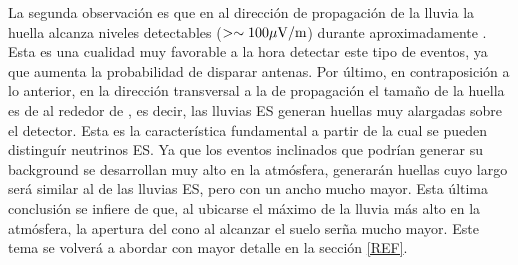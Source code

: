 	La segunda observación es que en al dirección de propagación de la lluvia la huella alcanza niveles detectables ($>\sim100{\rm \mu V/m}$) durante aproximadamente .
	Esta es una cualidad muy favorable a la hora detectar este tipo de eventos, ya que aumenta la probabilidad de disparar antenas.
	Por último, en contraposición a lo anterior, en la dirección transversal a la de propagación el tamaño de la huella es de al rededor de , es decir, las lluvias ES generan huellas muy alargadas sobre el detector.
	Esta es la característica fundamental a partir de la cual se pueden distinguír neutrinos ES. 
	Ya que los eventos inclinados que podrían generar su background se desarrollan muy alto en la atmósfera, generarán huellas cuyo largo será similar al de las lluvias ES, pero con un ancho mucho mayor.
	Esta última conclusión se infiere de que, al ubicarse el máximo de la lluvia más alto en la atmósfera, la apertura del cono al alcanzar el suelo serña mucho mayor.
	Este tema se volverá a abordar con mayor detalle en la sección \ref{REF}.
	
